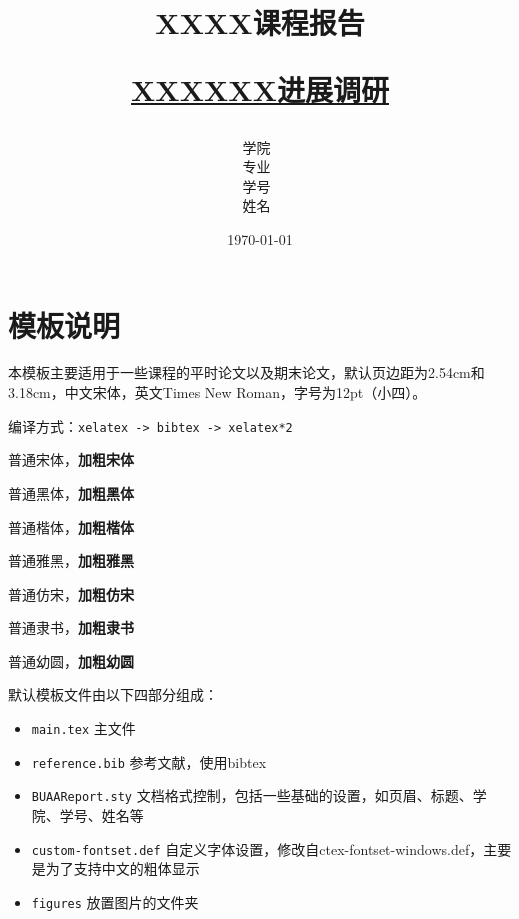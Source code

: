 \documentclass[12pt,a4paper,UTF8,fontset=none]{ctexart}
\title{ 
        \vspace{1cm}
        \heiti \Huge \textbf{{XXXX课程报告}} \par
        \vspace{1cm} 
        \heiti \Large {\underline{XXXXXX进展调研}}    
        \vspace{3cm}
    }
\author{
        \vspace{0.5cm}
        \kaishu\Large 学院\ \dlmu[9cm]{集成电路科学与工程学院} \\ %
        \vspace{0.5cm}
        \kaishu\Large 专业\ \dlmu[9cm]{集成电路工程} \\ %
        \vspace{0.5cm}
        \kaishu\Large 学号\ \dlmu[9cm]{ZY2441127} \qquad  \\ %
        \vspace{0.5cm}
        \kaishu\Large 姓名\ \dlmu[9cm]{刘雪慧} \qquad \\ %
    }
\date{\today} %
\begin{document}
\cover

%
%

\thispagestyle{empty} %


\newpage
\setcounter{page}{1} %


\section{模板说明}
本模板主要适用于一些课程的平时论文以及期末论文，默认页边距为2.54cm和3.18cm，中文宋体，英文Times New Roman，字号为12pt（小四）。

编译方式：\verb|xelatex -> bibtex -> xelatex*2|



普通宋体，\textbf{加粗宋体}

{\heiti 普通黑体，\textbf{加粗黑体}}

{\kaishu 普通楷体，\textbf{加粗楷体}}

{\yahei 普通雅黑，\textbf{加粗雅黑}}

{\fangsong 普通仿宋，\textbf{加粗仿宋}}

{\lishu 普通隶书，\textbf{加粗隶书}}

{\youyuan 普通幼圆，\textbf{加粗幼圆}}


默认模板文件由以下四部分组成：
\begin{itemize}
    \item \texttt{main.tex} 主文件
    \item \texttt{reference.bib} 参考文献，使用bibtex
    \item \texttt{BUAAReport.sty} 文档格式控制，包括一些基础的设置，如页眉、标题、学院、学号、姓名等
    \item \texttt{custom-fontset.def} 自定义字体设置，修改自ctex-fontset-windows.def，主要是为了支持中文的粗体显示
    \item \texttt{figures} 放置图片的文件夹
\end{itemize}
\end{document}
